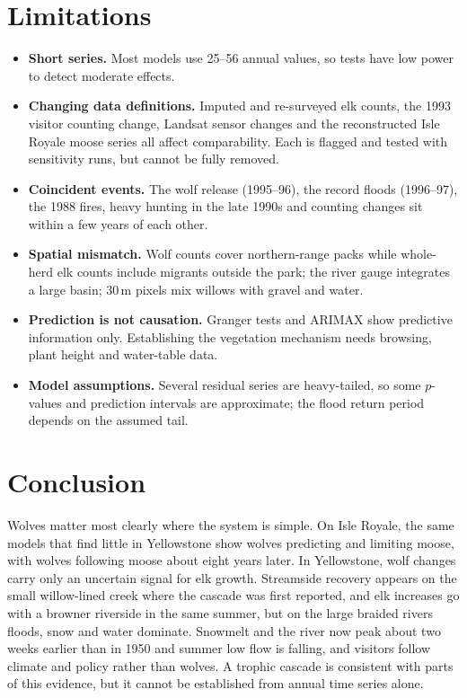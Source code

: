 \documentclass[11pt,a4paper]{article}
\begin{document}
\section{Limitations}
\begin{itemize}
\item \textbf{Short series.} Most models use 25--56 annual values, so tests have low power to detect moderate effects.
\item \textbf{Changing data definitions.} Imputed and re-surveyed elk counts, the 1993 visitor counting change, Landsat sensor changes and the reconstructed Isle Royale moose series all affect comparability. Each is flagged and tested with sensitivity runs, but cannot be fully removed.
\item \textbf{Coincident events.} The wolf release (1995--96), the record floods (1996--97), the 1988 fires, heavy hunting in the late 1990s and counting changes sit within a few years of each other.
\item \textbf{Spatial mismatch.} Wolf counts cover northern-range packs while whole-herd elk counts include migrants outside the park; the river gauge integrates a large basin; 30\,m pixels mix willows with gravel and water.
\item \textbf{Prediction is not causation.} Granger tests and ARIMAX show predictive information only. Establishing the vegetation mechanism needs browsing, plant height and water-table data.
\item \textbf{Model assumptions.} Several residual series are heavy-tailed, so some $p$-values and prediction intervals are approximate; the flood return period depends on the assumed tail.
\end{itemize}

\section{Conclusion}
Wolves matter most clearly where the system is simple. On Isle Royale, the same models that find little in Yellowstone show wolves predicting and limiting moose, with wolves following moose about eight years later. In Yellowstone, wolf changes carry only an uncertain signal for elk growth. Streamside recovery appears on the small willow-lined creek where the cascade was first reported, and elk increases go with a browner riverside in the same summer, but on the large braided rivers floods, snow and water dominate. Snowmelt and the river now peak about two weeks earlier than in 1950 and summer low flow is falling, and visitors follow climate and policy rather than wolves. A trophic cascade is consistent with parts of this evidence, but it cannot be established from annual time series alone.
\end{document}
